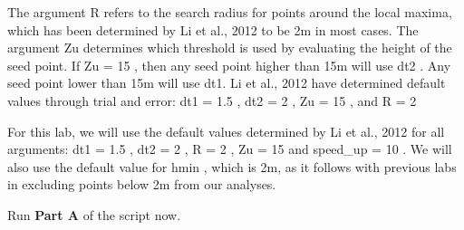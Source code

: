 \documentclass[
]{book}
\begin{document}
The argument R refers to the search radius for points around the local maxima, which has been determined by Li et al., 2012 to be 2m in most cases.
The argument Zu determines which threshold is used by evaluating the height of the seed point. If Zu = 15 , then any seed point higher than 15m will use dt2 . Any seed point lower than 15m will use dt1. Li et al., 2012 have determined default values through trial and error: dt1 = 1.5 , dt2 = 2 , Zu = 15 , and R = 2

For this lab, we will use the default values determined by Li et al., 2012 for all arguments: dt1 = 1.5 , dt2 = 2 , R = 2 , Zu = 15 and speed\_up = 10 . We will also use the default value for hmin , which is 2m, as it follows with previous labs in excluding points below 2m from our analyses.

Run \textbf{Part A} of the script now.
\end{document}
